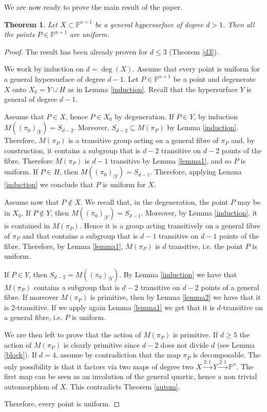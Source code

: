 \documentclass[12pt,a4paper,twoside,leqno,noamsfonts]{amsart}
\newtheorem{thm}[cor]{Theorem}
\theoremstyle{definition}
\newcommand{\bP}{\mathbb{P}}
\begin{document}
We are now ready to prove the main result of the paper.
\begin{thm}\label{interni}
Let $X \subset \bP^{n+1}$ be a general hypersurface of degree $d>1$. Then all the points $P \in \bP^{n+1}$ are uniform.
\end{thm}
\begin{proof}
The result has been already proven for $d \leq 3$ (Theorem \ref{d3}). 

We work by induction on $d=\deg(X)$. Assume that every point is uniform for a general hypersurface of degree $d-1$. Let $P \in \bP^{n+1}$ be a point and degenerate $X$ onto $X_0=Y \cup H$ as in Lemma \ref{induction}. Recall that the hypersurface $Y$ is general of degree $d-1$.
\medskip

Assume that $P \in X$, hence $P \in X_0$ by degeneration. If $P \in Y$, by induction $M((\pi_0)_{|Y})=S_{d-2}$. Moreover, $S_{d-2} \subseteq M(\pi_P)$ by Lemma \ref{induction}. Therefore, $M(\pi_P)$ is a transitive group acting on a general fibre of $\pi_P$ and, by construction, it contains a subgroup that is $d-2$ transitive on $d-2$ points of the fibre. Therefore $M(\pi_P)$ is $d-1$ transitive by Lemma \ref{lemma1}, and so $P$ is uniform. If $P \in H$, then $M((\pi_0)_{|Y})=S_{d-1}$. Therefore, applying Lemma \ref{induction} we conclude that $P$ is uniform for $X$.

\medskip
Assume now that $P \notin X$. We recall that, in the degeneration, the point $P$ may be in $X_0$. If $P \notin Y$, then $M((\pi_0)_{|Y})=S_{d-1}$. Moreover, by Lemma \ref{induction}, it is contained in $M(\pi_P)$. Hence it is a group acting transitively on a general fibre of $\pi_P$ and that contains a subgroup that is $d-1$ transitive on $d-1$ points of the fibre. Therefore, by Lemma \ref{lemma1}, $M(\pi_P)$ is $d$ transitive, i.e. the point $P$ is uniform.

If $P \in Y $, then $S_{d-2}= M((\pi_0)_{|Y})$. By Lemma \ref{induction} we have that $M(\pi_P)$ contains a subgroup that is $d-2$ transitive on $d-2$ points of a general fibre. If moreover $M(\pi_P)$ is primitive, then by Lemma \ref{lemma2} we have that it is $2$-transitive. If we apply again Lemma \ref{lemma1} we get that it is $d$-transitive on a general fibre, i.e. $P$ is uniform. 

We are then left to prove that the action of $M(\pi_P)$ is primitive. If $d \geq 5$ the action of $M(\pi_P)$ is clearly primitive since $d-2$ does not divide $d$ (see Lemma \ref{block}). If $d=4$, assume by contradiction that the map $\pi_P$ is decomposable. The only possibility is that it factors via two maps of degree two $X \stackrel{2:1}{\to} Y \stackrel{2:1}{\to} \bP^n.$ The first map can be seen as an involution of the general quartic, hence a non trivial automorphism of $X$. This contradicts Theorem \ref{autom}. 

Therefore, every point is uniform. 

\end{proof}
\end{document}
